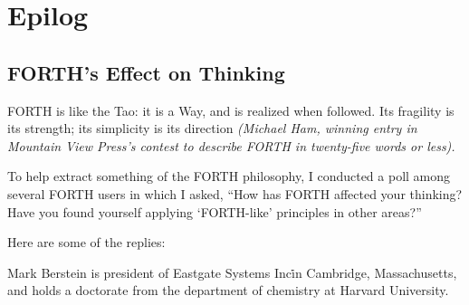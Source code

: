\part{Epilog}
\chapter{
FORTH's Effect
on Thinking}
\begin{tfquot}
FORTH is like the Tao: it is a Way, and is realized when followed.  Its
fragility is its strength; its simplicity is its direction {\em (Michael Ham,
winning entry in Mountain View Press's contest to describe FORTH in twenty-five 
words or less).}
\end{tfquot}

To help extract something of the FORTH philosophy, I conducted a poll
among several FORTH users in which I asked, ``How has FORTH affected
your thinking?  Have you found yourself applying `FORTH-like' 
principles in other areas?''

Here are some of the replies:

Mark Berstein is president of Eastgate Systems Inc\. in Cambridge, 
Massachusetts, and holds a doctorate from the department of 
chemistry at Harvard University.


